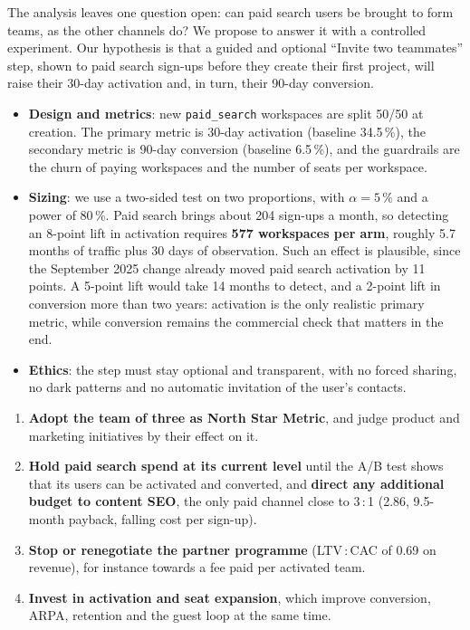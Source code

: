 \documentclass{rapportIMT}
\newcommand{\pc}{\,\%}
\begin{document}
The analysis leaves one question open: can paid search users be brought to form teams, as the other channels do? We propose to answer it with a controlled experiment. Our hypothesis is that a guided and optional ``Invite two teammates'' step, shown to paid search sign-ups before they create their first project, will raise their 30-day activation and, in turn, their 90-day conversion.
\begin{itemize}[nosep,topsep=2pt]
  \item \textbf{Design and metrics}: new \texttt{paid\_search} workspaces are split 50/50 at creation. The primary metric is 30-day activation (baseline 34.5\pc{}), the secondary metric is 90-day conversion (baseline 6.5\pc{}), and the guardrails are the churn of paying workspaces and the number of seats per workspace.
  \item \textbf{Sizing}: we use a two-sided test on two proportions, with $\alpha = 5\pc{}$ and a power of 80\pc{}. Paid search brings about 204 sign-ups a month, so detecting an 8-point lift in activation requires \textbf{577 workspaces per arm}, roughly 5.7 months of traffic plus 30 days of observation. Such an effect is plausible, since the September 2025 change already moved paid search activation by 11 points. A 5-point lift would take 14 months to detect, and a 2-point lift in conversion more than two years: activation is the only realistic primary metric, while conversion remains the commercial check that matters in the end.
  \item \textbf{Ethics}: the step must stay optional and transparent, with no forced sharing, no dark patterns and no automatic invitation of the user's contacts.
\end{itemize}

\begin{synthese}
\small
\begin{enumerate}[nosep,topsep=2pt,leftmargin=1.4em]
  \item \textbf{Adopt the team of three as North Star Metric}, and judge product and marketing initiatives by their effect on it.
  \item \textbf{Hold paid search spend at its current level} until the A/B test shows that its users can be activated and converted, and \textbf{direct any additional budget to content SEO}, the only paid channel close to 3\,:\,1 (2.86, 9.5-month payback, falling cost per sign-up).
  \item \textbf{Stop or renegotiate the partner programme} (LTV\,:\,CAC of 0.69 on revenue), for instance towards a fee paid per activated team.
  \item \textbf{Invest in activation and seat expansion}, which improve conversion, ARPA, retention and the guest loop at the same time.
\end{enumerate}
\end{synthese}
\end{document}

